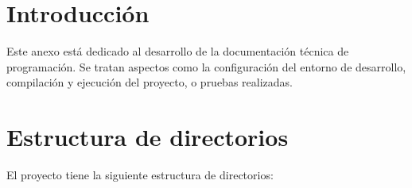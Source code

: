 
\section{Introducción}

Este anexo está dedicado al desarrollo de la documentación técnica de programación. Se tratan aspectos como la configuración del entorno de desarrollo, compilación y ejecución del proyecto, o pruebas realizadas.

\section{Estructura de directorios}

El proyecto tiene la siguiente estructura de directorios:

